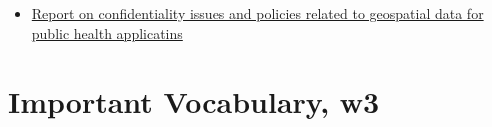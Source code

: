 \documentclass[
]{book}
\providecommand{\tightlist}{%
  \setlength{\itemsep}{0pt}\setlength{\parskip}{0pt}}
\begin{document}
\begin{itemize}
\tightlist
\item
  \href{http://www.ciesin.columbia.edu/pdf/SEDAC_ConfidentialityReport.pdf}{Report on confidentiality issues and policies related to geospatial data for public health applicatins}
\end{itemize}

\hypertarget{important-vocabulary-w3}{%
\section{Important Vocabulary, w3}\label{important-vocabulary-w3}}

 
  \providecommand{\huxb}[2]{\arrayrulecolor[RGB]{#1}\global\arrayrulewidth=#2pt}
  \providecommand{\huxvb}[2]{\color[RGB]{#1}\vrule width #2pt}
  \providecommand{\huxtpad}[1]{\rule{0pt}{#1}}
  \providecommand{\huxbpad}[1]{\rule[-#1]{0pt}{#1}}
\end{document}
